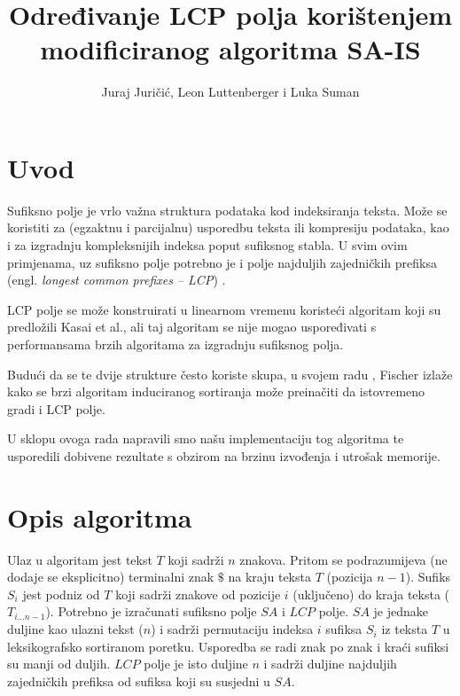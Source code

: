 \documentclass[times, utf8, proizvoljni, numeric]{fer}
\begin{document}
\nocite{*}

\title{Određivanje LCP polja korištenjem modificiranog algoritma SA-IS}

\author{Juraj Juričić, Leon Luttenberger i Luka Suman}

\maketitle

\tableofcontents

\chapter{Uvod}
Sufiksno polje je vrlo važna struktura podataka kod indeksiranja teksta. Može se koristiti za (egzaktnu i parcijalnu) usporedbu teksta ili kompresiju podataka, kao i za izgradnju kompleksnijih indeksa poput sufiksnog stabla. U svim ovim primjenama, uz sufiksno polje potrebno je i polje najduljih zajedničkih prefiksa (engl. \textit{longest common prefixes -- LCP}) \citep{fischer2011inducing}.

LCP polje se može konstruirati u linearnom vremenu koristeći algoritam koji su predložili Kasai et al.\citep{kasai2001linear}, ali taj algoritam se nije mogao uspoređivati s performansama brzih algoritama za izgradnju sufiksnog polja.

Budući da se te dvije strukture često koriste skupa, u svojem radu \citep{fischer2011inducing}, Fischer izlaže kako se brzi algoritam induciranog sortiranja može preinačiti da istovremeno gradi i LCP polje.

U sklopu ovoga rada napravili smo našu implementaciju tog algoritma te usporedili dobivene rezultate s obzirom na brzinu izvođenja i utrošak memorije.

\chapter{Opis algoritma}
Ulaz u algoritam jest tekst $T$ koji sadrži $n$ znakova. Pritom se podrazumijeva (ne dodaje se eksplicitno) terminalni znak $\$$ na kraju teksta $T$ (pozicija $n-1$). Sufiks $S_{i}$ jest podniz od $T$ koji sadrži znakove od pozicije $i$ (uključeno) do kraja teksta ($T_{i...n-1}$). Potrebno je izračunati sufiksno polje $SA$ i $LCP$ polje. $SA$ je jednake duljine kao ulazni tekst ($n$) i sadrži permutaciju indeksa $i$ sufiksa $S_{i}$ iz teksta $T$ u leksikografsko sortiranom poretku. Usporedba se radi znak po znak i kraći sufiksi su manji od duljih. $LCP$ polje je isto duljine $n$ i sadrži duljine najduljih zajedničkih prefiksa od sufiksa koji su susjedni u $SA$.
\end{document}
